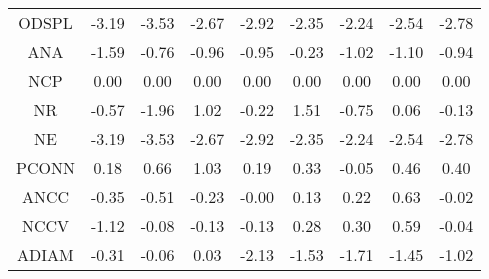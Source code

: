 \documentclass[11pt,a4paper]{report}
\begin{document}
\begin{longtable}{ | c || c | c | c | c | c | c | c || c |}
ODSPL &  \cellcolor[HTML]{FFAFAF} -3.19 &  \cellcolor[HTML]{FFA7A7} -3.53 &  \cellcolor[HTML]{FFBFBF} -2.67 &  \cellcolor[HTML]{FFB7B7} -2.92 &  \cellcolor[HTML]{FFC7C7} -2.35 &  \cellcolor[HTML]{FFC7C7} -2.24 &  \cellcolor[HTML]{FFBFBF} -2.54 &  \cellcolor[HTML]{FFB7B7} -2.78 \\
ANA &  \cellcolor[HTML]{FFD7D7} -1.59 &  \cellcolor[HTML]{FFEFEF} -0.76 &  \cellcolor[HTML]{FFE7E7} -0.96 &  \cellcolor[HTML]{FFE7E7} -0.95 &  \cellcolor[HTML]{FFF7F7} -0.23 &  \cellcolor[HTML]{FFE7E7} -1.02 &  \cellcolor[HTML]{FFE7E7} -1.10 &  \cellcolor[HTML]{FFE7E7} -0.94 \\
NCP &  \cellcolor[HTML]{FFFFFF} 0.00 &  \cellcolor[HTML]{FFFFFF} 0.00 &  \cellcolor[HTML]{FFFFFF} 0.00 &  \cellcolor[HTML]{FFFFFF} 0.00 &  \cellcolor[HTML]{FFFFFF} 0.00 &  \cellcolor[HTML]{FFFFFF} 0.00 &  \cellcolor[HTML]{FFFFFF} 0.00 &  \cellcolor[HTML]{FFFFFF} 0.00 \\
NR &  \cellcolor[HTML]{FFEFEF} -0.57 &  \cellcolor[HTML]{FFCFCF} -1.96 &  \cellcolor[HTML]{E7E7FF} 1.02 &  \cellcolor[HTML]{FFF7F7} -0.22 &  \cellcolor[HTML]{D7D7FF} 1.51 &  \cellcolor[HTML]{FFEFEF} -0.75 &  \cellcolor[HTML]{FFFFFF} 0.06 &  \cellcolor[HTML]{FFFFFF} -0.13 \\
NE &  \cellcolor[HTML]{FFAFAF} -3.19 &  \cellcolor[HTML]{FFA7A7} -3.53 &  \cellcolor[HTML]{FFBFBF} -2.67 &  \cellcolor[HTML]{FFB7B7} -2.92 &  \cellcolor[HTML]{FFC7C7} -2.35 &  \cellcolor[HTML]{FFC7C7} -2.24 &  \cellcolor[HTML]{FFBFBF} -2.54 &  \cellcolor[HTML]{FFB7B7} -2.78 \\
PCONN &  \cellcolor[HTML]{F7F7FF} 0.18 &  \cellcolor[HTML]{EFEFFF} 0.66 &  \cellcolor[HTML]{E7E7FF} 1.03 &  \cellcolor[HTML]{F7F7FF} 0.19 &  \cellcolor[HTML]{F7F7FF} 0.33 &  \cellcolor[HTML]{FFFFFF} -0.05 &  \cellcolor[HTML]{F7F7FF} 0.46 &  \cellcolor[HTML]{F7F7FF} 0.40 \\
ANCC &  \cellcolor[HTML]{FFF7F7} -0.35 &  \cellcolor[HTML]{FFEFEF} -0.51 &  \cellcolor[HTML]{FFF7F7} -0.23 &  \cellcolor[HTML]{FFFFFF} -0.00 &  \cellcolor[HTML]{FFFFFF} 0.13 &  \cellcolor[HTML]{F7F7FF} 0.22 &  \cellcolor[HTML]{EFEFFF} 0.63 &  \cellcolor[HTML]{FFFFFF} -0.02 \\
NCCV &  \cellcolor[HTML]{FFDFDF} -1.12 &  \cellcolor[HTML]{FFFFFF} -0.08 &  \cellcolor[HTML]{FFFFFF} -0.13 &  \cellcolor[HTML]{FFFFFF} -0.13 &  \cellcolor[HTML]{F7F7FF} 0.28 &  \cellcolor[HTML]{F7F7FF} 0.30 &  \cellcolor[HTML]{EFEFFF} 0.59 &  \cellcolor[HTML]{FFFFFF} -0.04 \\
ADIAM &  \cellcolor[HTML]{FFF7F7} -0.31 &  \cellcolor[HTML]{FFFFFF} -0.06 &  \cellcolor[HTML]{FFFFFF} 0.03 &  \cellcolor[HTML]{FFC7C7} -2.13 &  \cellcolor[HTML]{FFD7D7} -1.53 &  \cellcolor[HTML]{FFD7D7} -1.71 &  \cellcolor[HTML]{FFD7D7} -1.45 &  \cellcolor[HTML]{FFE7E7} -1.02 \\

\end{longtable}
\end{document}
